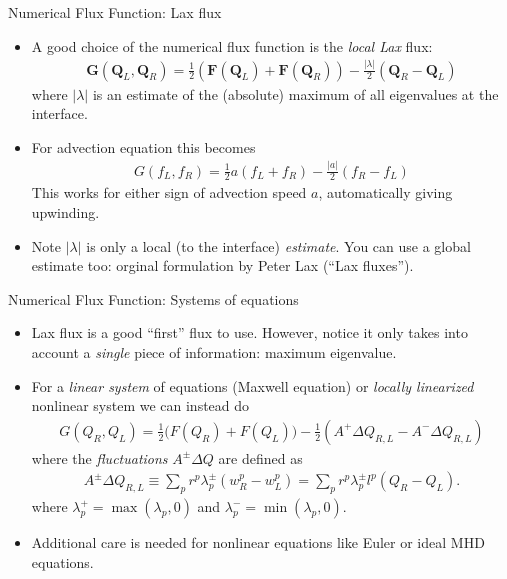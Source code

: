\documentclass[aspectratio=169]{beamer}
\newcommand{\mypause}{\pause}
\newcommand{\mvec}[1]{\mathbf{#1}}
\begin{document}
\begin{frame}{Numerical Flux Function: Lax flux}
  \small%
  \begin{itemize}
  \item A good choice of the numerical flux function is the
    \emph{local Lax} flux:
    \begin{align*}
      \mvec{G}(\mvec{Q}_L,\mvec{Q}_R) = \frac{1}{2}
      \left( \mvec{F}(\mvec{Q}_L) + \mvec{F}(\mvec{Q}_R) \right)
      - \frac{|\lambda|}{2}( \mvec{Q}_R - \mvec{Q}_L )
    \end{align*}
    where $|\lambda|$ is an estimate of the (absolute) maximum of all
    eigenvalues at the interface.%
    \mypause%
  \item   For advection equation this becomes
    \begin{align*}
      G(f_L,f_R) = \frac{1}{2} a ( f_L + f_R ) - \frac{|a|}{2}( f_R - f_L )
    \end{align*}
    This works for either sign of advection speed $a$, automatically
    giving upwinding.%
    \mypause%
  \item Note $|\lambda|$ is only a local (to the interface)
    \emph{estimate}. You can use a global estimate too: orginal
    formulation by Peter Lax (``Lax fluxes'').
  \end{itemize}

\end{frame}

\begin{frame}{Numerical Flux Function: Systems of equations}
  \small%
  \begin{itemize}
  \item Lax flux is a good ``first'' flux to use. However, notice it
    only takes into account a \emph{single} piece of information:
    maximum eigenvalue.%
    \mypause%
  \item For a \emph{linear system} of equations (Maxwell equation) or
    \emph{locally linearized} nonlinear system we can instead do
    \begin{align*}
      G(Q_R,Q_L) = \frac{1}{2}\big(F(Q_R)+F(Q_L)\big) - \frac{1}{2}(A^+\Delta Q_{R,L} - A^-\Delta Q_{R,L})      
    \end{align*}
    where the \emph{fluctuations} $A^\pm\Delta Q$ are defined as
    \begin{align*}
      A^\pm\Delta Q_{R,L} \equiv \sum_p r^p \lambda^\pm_p (w_R^p-w_L^p) = \sum_p r^p \lambda^\pm_p l^p(Q_R-Q_L).
    \end{align*}
    where $\lambda_p^+ = \max(\lambda_p,0)$ and
    $\lambda_p^- = \min(\lambda_p,0)$.%
    \mypause%
  \item Additional care is needed for nonlinear equations like Euler
    or ideal MHD equations.
  \end{itemize}
\end{frame}
\end{document}

